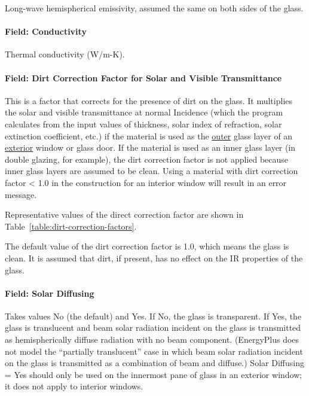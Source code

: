 Long-wave hemispherical emissivity, assumed the same on both sides of the glass.

\paragraph{Field: Conductivity}\label{field-conductivity-2}

Thermal conductivity (W/m-K).

\paragraph{Field: Dirt Correction Factor for Solar and Visible Transmittance}\label{field-dirt-correction-factor-for-solar-and-visible-transmittance-1}

This is a factor that corrects for the presence of dirt on the glass. It multiplies the solar and visible transmittance at normal Incidence (which the program calculates from the input values of thickness, solar index of refraction, solar extinction coefficient, etc.) if the material is used as the \underline{outer} glass layer of an \underline{exterior} window or glass door. If the material is used as an inner glass layer (in double glazing, for example), the dirt correction factor is not applied because inner glass layers are assumed to be clean. Using a material with dirt correction factor \textless{} 1.0 in the construction for an interior window will result in an error message.

Representative values of the direct correction factor are shown in Table~\ref{table:dirt-correction-factors}.

The default value of the dirt correction factor is 1.0, which means the glass is clean. It is assumed that dirt, if present, has no effect on the IR properties of the glass.

\paragraph{Field: Solar Diffusing}\label{field-solar-diffusing-1}

Takes values No (the default) and Yes. If No, the glass is transparent. If Yes, the glass is translucent and beam solar radiation incident on the glass is transmitted as hemispherically diffuse radiation with no beam component. (EnergyPlus does not model the ``partially translucent'' case in which beam solar radiation incident on the glass is transmitted as a combination of beam and diffuse.) Solar Diffusing = Yes should only be used on the innermost pane of glass in an exterior window; it does not apply to interior windows.

